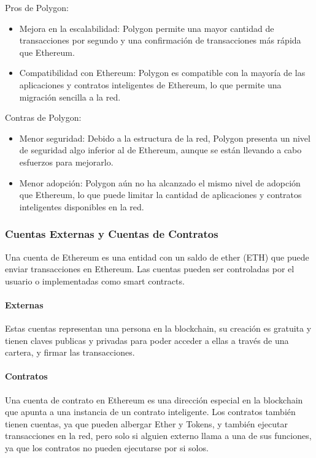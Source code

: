 \bigskip

Pros de Polygon:

\begin{itemize}
    \item Mejora en la escalabilidad: Polygon permite una mayor cantidad de transacciones por segundo y una confirmación de transacciones más rápida que Ethereum.
    \item Compatibilidad con Ethereum: Polygon es compatible con la mayoría de las aplicaciones y contratos inteligentes de Ethereum, lo que permite una migración sencilla a la red.
\end{itemize}

Contras de Polygon:

\begin{itemize}
    \item Menor seguridad: Debido a la estructura de la red, Polygon presenta un nivel de seguridad algo inferior al de Ethereum, aunque se están llevando a cabo esfuerzos para mejorarlo.
    \item Menor adopción: Polygon aún no ha alcanzado el mismo nivel de adopción que Ethereum, lo que puede limitar la cantidad de aplicaciones y contratos inteligentes disponibles en la red.
\end{itemize}

\subsubsection{Cuentas Externas y Cuentas de Contratos}

Una cuenta de Ethereum es una entidad con un saldo de ether (ETH) que puede enviar transacciones en Ethereum. Las cuentas pueden ser controladas por el usuario o implementadas como smart contracts.

\paragraph{Externas}

Estas cuentas representan una persona en la blockchain, su creación es gratuita y tienen claves publicas y privadas para poder acceder a ellas a través de una cartera, y firmar las transacciones.

\paragraph{Contratos}

Una cuenta de contrato en Ethereum es una dirección especial en la blockchain que apunta a una instancia de un contrato inteligente. Los contratos también tienen cuentas, ya que pueden albergar Ether y Tokens, y también ejecutar transacciones en la red, pero solo si alguien externo llama a una de sus funciones, ya que los contratos no pueden ejecutarse por si solos.

